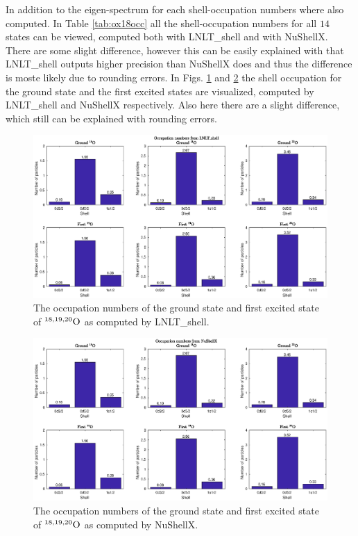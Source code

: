 \twocolumngrid

In addition to the eigen-spectrum for each shell-occupation numbers where also computed. In Table \ref{tab:ox18occ} all the shell-occupation numbers for all \(14\) states can be viewed, computed both with LNLT\_shell and with NuShellX. There are some slight difference, however this can be easily explained with that LNLT\_shell outputs higher precision than NuShellX does and thus the difference is moste likely due to rounding errors. In Figs. \ref{fig:occnum_lnlt} and \ref{fig:occnum_nushellx} the shell occupation for the ground state and the first excited states are visualized, computed by LNLT\_shell and NuShellX respectively. Also here there are a slight difference, which still can be explained with rounding errors. \\

\onecolumngrid

\begin{figure}[H]
  \begin{center}
  \includegraphics[scale=0.5]{occupation_numbers_lnlt.eps}
  \caption{The occupation numbers of the ground state and first excited state of \(^{18,19,20}\rm{O}\) as computed by LNLT\_shell.}
  \label{fig:occnum_lnlt}
  \end{center}
\end{figure}

\begin{figure}[H]
  \begin{center}
  \includegraphics[scale=0.5]{occupation_numbers_nushellx.eps}
  \caption{The occupation numbers of the ground state and first excited state of \(^{18,19,20}\rm{O}\) as computed by NuShellX.}
  \label{fig:occnum_nushellx}
  \end{center}
\end{figure}

\twocolumngrid
